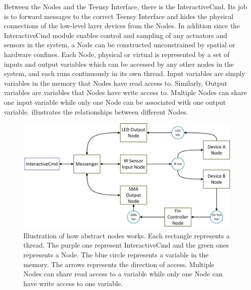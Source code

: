 Between the Nodes and the Teensy Interface, there is the InteractiveCmd. Its job is to forward messages to the correct Teensy Interface and hides the physical connections of the low-level layer devices from the Nodes. In addition since the InteractiveCmd module enables control and sampling of any actuators and sensors in the system, a Node can be constructed unconstrained by spatial or hardware confines. Each Node, physical or virtual is represented by a set of inputs and output variables which can be accessed by any other nodes in the system, and each runs continuously in its own thread. Input variables are simply variables in the memory that Nodes have read access to. Similarly, Output variables are variables that Nodes have write access to. Multiple Nodes can share one input variable while only one Node can be associated with one output variable.  illustrates the relationships between different Nodes. 

\begin{figure}[!htbp]
	\centering
	\includegraphics[width=1.0 \textwidth]{"fig/interactive control system/Node_abstraction"}
	\caption[Illustration of how abstract nodes works]{Illustration of how abstract nodes works. Each rectangle represents a thread. The purple one represent InteractiveCmd and the green ones represents a Node. The blue circle represents a variable in the memory. The arrows represents the direction of access. Multiple Nodes can share read access to a variable while only one Node can have write access to one variable.}
	\label{fig:Node_abstraction}
\end{figure}

